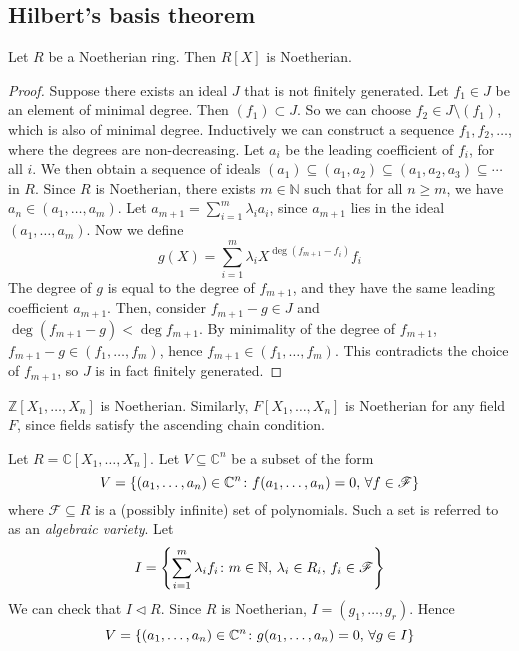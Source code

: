 \subsection{Hilbert's basis theorem}
\begin{theorem}
	Let \( R \) be a Noetherian ring.
	Then \( R[X] \) is Noetherian.
\end{theorem}
\begin{proof}
	Suppose there exists an ideal \( J \) that is not finitely generated.
	Let \( f_1 \in J \) be an element of minimal degree.
	Then \( (f_1) \subset J \).
	So we can choose \( f_2 \in J \setminus (f_1) \), which is also of minimal degree.
	Inductively we can construct a sequence \( f_1, f_2, \dots \), where the degrees are non-decreasing.
	Let \( a_i \) be the leading coefficient of \( f_i \), for all \( i \).
	We then obtain a sequence of ideals \( (a_1) \subseteq (a_1, a_2) \subseteq (a_1, a_2, a_3) \subseteq \cdots \) in \( R \).
	Since \( R \) is Noetherian, there exists \( m \in \mathbb N \) such that for all \( n \geq m \), we have \( a_{n} \in (a_1, \dots, a_m) \).
	Let \( a_{m+1} = \sum_{i=1}^m \lambda_i a_i \), since \( a_{m+1} \) lies in the ideal \( (a_1, \dots, a_m) \).
	Now we define
	\[
		g(X) = \sum_{i=1}^m \lambda_i X^{\deg (f_{m+1} - f_i)} f_i
	\]
	The degree of \( g \) is equal to the degree of \( f_{m+1} \), and they have the same leading coefficient \( a_{m+1} \).
	Then, consider \( f_{m+1} - g \in J \) and \( \deg (f_{m+1} - g) < \deg f_{m+1} \).
	By minimality of the degree of \( f_{m+1} \), \( f_{m+1} - g \in (f_1, \dots, f_m) \), hence \( f_{m+1} \in (f_1, \dots, f_m) \).
	This contradicts the choice of \( f_{m+1} \), so \( J \) is in fact finitely generated.
\end{proof}
\begin{corollary}
	\( \mathbb Z[X_1, \dots, X_n] \) is Noetherian.
	Similarly, \( F[X_1, \dots, X_n] \) is Noetherian for any field \( F \), since fields satisfy the ascending chain condition.
\end{corollary}
\begin{example}
	Let \( R = \mathbb C[X_1, \dots, X_n] \).
	Let \( V \subseteq \mathbb C^n \) be a subset of the form
	\[
		V = \qty{(a_1, \dots, a_n) \in \mathbb C^n \colon f(a_1, \dots, a_n) = 0,\,\forall f \in \mathscr F}
	\]
	where \( \mathscr F \subseteq R \) is a (possibly infinite) set of polynomials.
	Such a set is referred to as an \textit{algebraic variety}.
	Let
	\[
		I = \qty{\sum_{i=1}^m \lambda_i f_i \colon m \in \mathbb N,\, \lambda_i \in R_i,\, f_i \in \mathscr F}
	\]
	We can check that \( I \triangleleft R \).
	Since \( R \) is Noetherian, \( I = (g_1, \dots, g_r) \).
	Hence
	\[
		V = \qty{(a_1, \dots, a_n) \in \mathbb C^n \colon g(a_1, \dots, a_n) = 0,\,\forall g \in I}
	\]
\end{example}
